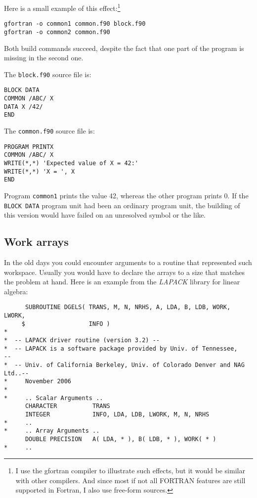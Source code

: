 Here is a small example of this effect:\footnote{I use the gfortran compiler
to illustrate such effects, but it would be similar with other compilers.
And since most if not all FORTRAN features are still supported in Fortran,
I also use free-form sources.}
%
\begin{verbatim}
gfortran -o common1 common.f90 block.f90
gfortran -o common2 common.f90
\end{verbatim}

Both build commands succeed, despite the fact that one part of the program is missing
in the second one.

The \verb+block.f90+ source file is:
%
\begin{verbatim}
BLOCK DATA
COMMON /ABC/ X
DATA X /42/
END
\end{verbatim}

The \verb+common.f90+ source file is:
%
\begin{verbatim}
PROGRAM PRINTX
COMMON /ABC/ X
WRITE(*,*) 'Expected value of X = 42:'
WRITE(*,*) 'X = ', X
END
\end{verbatim}

Program \verb+common1+ prints the value 42, whereas the other
program prints 0. If the \verb+BLOCK DATA+ program unit had been
an ordinary program unit, the building of this version would have failed
on an unresolved symbol or the like.


\subsection{Work arrays}
In the old days you could encounter arguments to a routine that represented
such workspace. Usually you would have to declare the arrays to a size that
matches the problem at hand. Here is an example from the \emph{LAPACK} library
for linear algebra:
%
\begin{verbatim}
      SUBROUTINE DGELS( TRANS, M, N, NRHS, A, LDA, B, LDB, WORK, LWORK,
     $                  INFO )
*
*  -- LAPACK driver routine (version 3.2) --
*  -- LAPACK is a software package provided by Univ. of Tennessee,    --
*  -- Univ. of California Berkeley, Univ. of Colorado Denver and NAG Ltd..--
*     November 2006
*
*     .. Scalar Arguments ..
      CHARACTER          TRANS
      INTEGER            INFO, LDA, LDB, LWORK, M, N, NRHS
*     ..
*     .. Array Arguments ..
      DOUBLE PRECISION   A( LDA, * ), B( LDB, * ), WORK( * )
*     ..
\end{verbatim}

